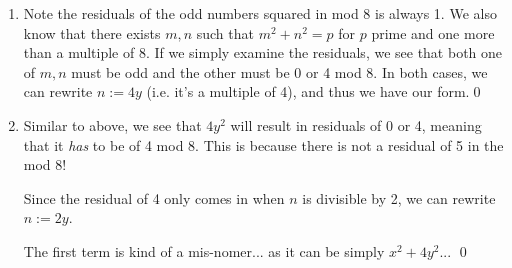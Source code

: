 \begin{Exercise}
	\begin{enumerate}
		\item Note the residuals of the odd numbers squared in mod 8 is always 1. 
		We also know that there exists $m, n$ such that $m^2 + n^2 = p$ for $p$ prime and one more than a multiple of 8.
		If we simply examine the residuals, we see that both one of $m, n$ must be odd and the other must be 0 or 4 mod 8. 
		In both cases, we can rewrite $n := 4y$ (i.e. it's a multiple of 4), and thus we have our form.\qed

		\item Similar to above, we see that $4y^2$ will result in residuals of 0 or 4, meaning that it \emph{has} to be of 4 mod 8.
		This is because there is not a residual of 5 in the mod 8! 

		Since the residual of 4 only comes in when $n$ is divisible by 2, we can rewrite $n:=2y$.

		The first term is kind of a mis-nomer... as it can be simply $x^2 + 4y^2$... \qed
	\end{enumerate}
\end{Exercise}
